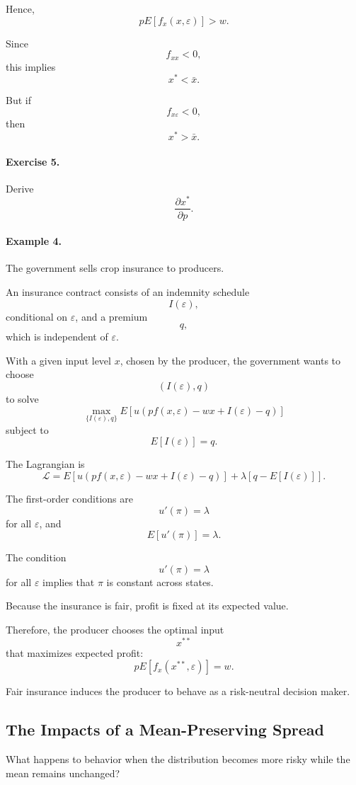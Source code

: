Hence,
\[
pE[f_x(x,\varepsilon)]>w.
\]

Since
\[
f_{xx}<0,
\]
this implies
\[
x^*<\bar x.
\]

But if
\[
f_{x\varepsilon}<0,
\]
then
\[
x^*>\bar x.
\]

\paragraph{Exercise 5.}

Derive
\[
\frac{\partial x^*}{\partial p}.
\]

\paragraph{Example 4.}

The government sells crop insurance to producers.

An insurance contract consists of an indemnity schedule
\[
I(\varepsilon),
\]
conditional on \(\varepsilon\), and a premium
\[
q,
\]
which is independent of \(\varepsilon\).

With a given input level \(x\), chosen by the producer, the government wants to choose
\[
(I(\varepsilon),q)
\]
to solve
\[
\max_{\{I(\varepsilon),q\}}
E[u(pf(x,\varepsilon)-wx+I(\varepsilon)-q)]
\]
subject to
\[
E[I(\varepsilon)]=q.
\]

The Lagrangian is
\[
\mathcal{L}
=
E[u(pf(x,\varepsilon)-wx+I(\varepsilon)-q)]
+
\lambda
\left[
q-E[I(\varepsilon)]
\right].
\]

The first-order conditions are
\[
u'(\pi)=\lambda
\]
for all \(\varepsilon\), and
\[
E[u'(\pi)]=\lambda.
\]

The condition
\[
u'(\pi)=\lambda
\]
for all \(\varepsilon\) implies that \(\pi\) is constant across states.

Because the insurance is fair, profit is fixed at its expected value.

Therefore, the producer chooses the optimal input
\[
x^{**}
\]
that maximizes expected profit:
\[
pE[f_x(x^{**},\varepsilon)]=w.
\]

Fair insurance induces the producer to behave as a risk-neutral decision maker.

\subsection{The Impacts of a Mean-Preserving Spread}

What happens to behavior when the distribution becomes more risky while the mean remains unchanged?

